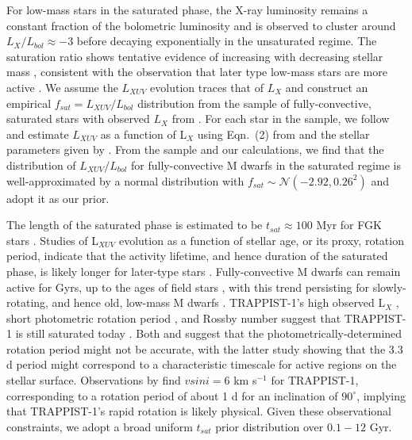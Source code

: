 \documentclass[twocolumn]{aastex62}
\begin{document}
For low-mass stars in the saturated phase, the X-ray luminosity remains a constant fraction of the bolometric luminosity and is observed to cluster around $L_X/L_{bol} \approx -3$ \citep{Pizzolato2003,Wright2011,Wright2018} before decaying exponentially in the unsaturated regime. The saturation ratio shows tentative evidence of increasing with decreasing stellar mass \citep{Wright2011,Jackson2012}, consistent with the observation that later type low-mass stars are more active \citep[e.g.][]{West2008}. We assume the $L_{XUV}$ evolution traces that of $L_{X}$ and construct an empirical $f_{sat} = L_{XUV}/L_{bol}$ distribution from the sample of fully-convective, saturated stars with observed $L_{X}$ from \citet{Wright2011}. For each star in the sample, we follow \citet{Wheatley2017} and estimate $L_{XUV}$ as a function of L$_{X}$ using Eqn.~(2) from \citet{Chadney2015} and the stellar parameters given by \citet{Wright2011}. From the \citet{Wright2011} sample and our calculations, we find that the distribution of $L_{XUV}/L_{bol}$ for fully-convective M dwarfs in the saturated regime is well-approximated by a normal distribution with $f_{sat} \sim \mathcal{N}(-2.92, 0.26^2)$ and adopt it as our prior. 
 
The length of the saturated phase is estimated to be $t_{sat} \approx 100$ Myr for FGK stars \citep{Jackson2012}. Studies of L$_{XUV}$ evolution as a function of stellar age, or its proxy, rotation period, indicate that the activity lifetime, and hence duration of the saturated phase, is likely longer for later-type stars \citep{Shkolnik2014,Wright2011,GonzalezAlvarez2019}. Fully-convective M dwarfs can remain active for Gyrs, up to the ages of field stars \citep{West2008,Schneider2018}, with this trend persisting for slowly-rotating, and hence old, low-mass M dwarfs \citep{West2015}. TRAPPIST-1's high observed L$_{X}$ \citep{Wheatley2017}, short photometric rotation period \citep[3.3 d, ][]{Luger2017}, and Rossby number \citep[Ro $\approx 0.01$, ][]{Wright2018} suggest that TRAPPIST-1 is still saturated today \citep{Pizzolato2003,Wright2011,Wright2018,GonzalezAlvarez2019}. Both \citet{Roettenbacher2017} and \citet{Morris2018} suggest that the photometrically-determined rotation period might not be accurate, with the latter study showing that the 3.3 d period might correspond to a characteristic timescale for active regions on the stellar surface. Observations by \citet{Barnes2014} find $vsini = 6$ km s$^{-1}$ for TRAPPIST-1, corresponding to a rotation period of about 1 d for an inclination of $90^{\circ}$, implying that TRAPPIST-1's rapid rotation is likely physical.  Given these observational constraints, we adopt a broad uniform $t_{sat}$ prior distribution over $0.1 - 12$ Gyr.
\end{document}
